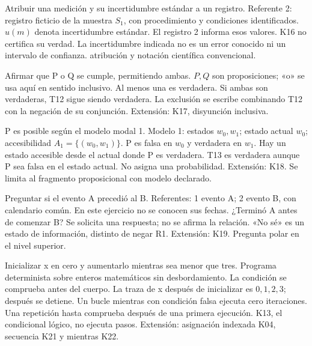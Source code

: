  {Atribuir una medición y su incertidumbre estándar a un registro.}
 {}
 {Referente 2: registro ficticio de la muestra \(S_1\), con procedimiento y condiciones identificados. \(u(m)\) denota incertidumbre estándar.}
 {El registro 2 informa esos valores.}
 {K16 no certifica su verdad. La incertidumbre indicada no es un error conocido ni un intervalo de confianza.}
 {atribución y notación científica convencional.}

 {Afirmar que P o Q se cumple, permitiendo ambas.}
 {}
 {\(P,Q\) son proposiciones; «o» se usa aquí en sentido inclusivo.}
 {Al menos una es verdadera.}
 {Si ambas son verdaderas, T12 sigue siendo verdadera. La exclusión se escribe combinando T12 con la negación de su conjunción.}
 {Extensión: K17, disyunción inclusiva.}

 {P es posible según el modelo modal 1.}
 {}
 {Modelo 1: estados \(w_0,w_1\); estado actual \(w_0\); accesibilidad \(A_1=\{(w_0,w_1)\}\). P es falsa en \(w_0\) y verdadera en \(w_1\).}
 {Hay un estado accesible desde el actual donde P es verdadera.}
 {T13 es verdadera aunque P sea falsa en el estado actual. No asigna una probabilidad.}
 {Extensión: K18. Se limita al fragmento proposicional con modelo declarado.}

 {Preguntar si el evento A precedió al B.}
 {}
 {Referentes: 1 evento A; 2 evento B, con calendario común. En este ejercicio no se conocen sus fechas.}
 {¿Terminó A antes de comenzar B?}
 {Se solicita una respuesta; no se afirma la relación. «No sé» es un estado de información, distinto de negar R1.}
 {Extensión: K19. Pregunta polar en el nivel superior.}

 {Inicializar x en cero y aumentarlo mientras sea menor que tres.}
 {}
 {Programa determinista sobre enteros matemáticos sin desbordamiento. La condición se comprueba antes del cuerpo.}
 {La traza de x después de inicializar es \(0,1,2,3\); después se detiene.}
 {Un bucle mientras con condición falsa ejecuta cero iteraciones. Una repetición hasta comprueba después de una primera ejecución. K13, el condicional lógico, no ejecuta pasos.}
 {Extensión: asignación indexada K04, secuencia K21 y mientras K22.}

